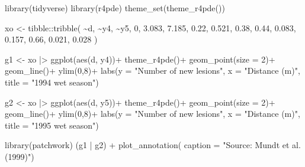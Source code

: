 \documentclass[
  letterpaper,
]{book}
\newenvironment{Shaded}{\begin{snugshade}}{\end{snugshade}}
\newcommand{\AttributeTok}[1]{\textcolor[rgb]{0.40,0.45,0.13}{#1}}
\newcommand{\DecValTok}[1]{\textcolor[rgb]{0.68,0.00,0.00}{#1}}
\newcommand{\FloatTok}[1]{\textcolor[rgb]{0.68,0.00,0.00}{#1}}
\newcommand{\FunctionTok}[1]{\textcolor[rgb]{0.28,0.35,0.67}{#1}}
\newcommand{\NormalTok}[1]{\textcolor[rgb]{0.00,0.23,0.31}{#1}}
\newcommand{\OtherTok}[1]{\textcolor[rgb]{0.00,0.23,0.31}{#1}}
\newcommand{\SpecialCharTok}[1]{\textcolor[rgb]{0.37,0.37,0.37}{#1}}
\newcommand{\StringTok}[1]{\textcolor[rgb]{0.13,0.47,0.30}{#1}}
\begin{document}
\begin{Shaded}
\begin{Highlighting}[]
\FunctionTok{library}\NormalTok{(tidyverse)}
\FunctionTok{library}\NormalTok{(r4pde)}
\FunctionTok{theme\_set}\NormalTok{(}\FunctionTok{theme\_r4pde}\NormalTok{())}

\NormalTok{xo }\OtherTok{\textless{}{-}} 
\NormalTok{tibble}\SpecialCharTok{::}\FunctionTok{tribble}\NormalTok{(}
    \SpecialCharTok{\textasciitilde{}}\NormalTok{d,   }\SpecialCharTok{\textasciitilde{}}\NormalTok{y4,   }\SpecialCharTok{\textasciitilde{}}\NormalTok{y5,}
     \DecValTok{0}\NormalTok{, }\FloatTok{3.083}\NormalTok{, }\FloatTok{7.185}\NormalTok{,}
  \FloatTok{0.22}\NormalTok{, }\FloatTok{0.521}\NormalTok{,  }\FloatTok{0.38}\NormalTok{,}
  \FloatTok{0.44}\NormalTok{, }\FloatTok{0.083}\NormalTok{, }\FloatTok{0.157}\NormalTok{,}
  \FloatTok{0.66}\NormalTok{, }\FloatTok{0.021}\NormalTok{, }\FloatTok{0.028}
\NormalTok{  )}

\NormalTok{g1 }\OtherTok{\textless{}{-}}\NormalTok{ xo }\SpecialCharTok{|\textgreater{}} 
  \FunctionTok{ggplot}\NormalTok{(}\FunctionTok{aes}\NormalTok{(d, y4))}\SpecialCharTok{+}
 \FunctionTok{theme\_r4pde}\NormalTok{()}\SpecialCharTok{+}
  \FunctionTok{geom\_point}\NormalTok{(}\AttributeTok{size =} \DecValTok{2}\NormalTok{)}\SpecialCharTok{+}
  \FunctionTok{geom\_line}\NormalTok{()}\SpecialCharTok{+}
  \FunctionTok{ylim}\NormalTok{(}\DecValTok{0}\NormalTok{,}\DecValTok{8}\NormalTok{)}\SpecialCharTok{+}
  \FunctionTok{labs}\NormalTok{(}\AttributeTok{y =} \StringTok{"Number of new lesions"}\NormalTok{,}
       \AttributeTok{x =} \StringTok{"Distance (m)"}\NormalTok{,}
       \AttributeTok{title =} \StringTok{"1994 wet season"}\NormalTok{)}

\NormalTok{g2 }\OtherTok{\textless{}{-}}\NormalTok{ xo }\SpecialCharTok{|\textgreater{}} 
  \FunctionTok{ggplot}\NormalTok{(}\FunctionTok{aes}\NormalTok{(d, y5))}\SpecialCharTok{+}
  \FunctionTok{theme\_r4pde}\NormalTok{()}\SpecialCharTok{+}
  \FunctionTok{geom\_point}\NormalTok{(}\AttributeTok{size =} \DecValTok{2}\NormalTok{)}\SpecialCharTok{+}
  \FunctionTok{geom\_line}\NormalTok{()}\SpecialCharTok{+}
  \FunctionTok{ylim}\NormalTok{(}\DecValTok{0}\NormalTok{,}\DecValTok{8}\NormalTok{)}\SpecialCharTok{+}
  \FunctionTok{labs}\NormalTok{(}\AttributeTok{y =} \StringTok{"Number of new lesions"}\NormalTok{,}
       \AttributeTok{x =} \StringTok{"Distance (m)"}\NormalTok{,}
       \AttributeTok{title =} \StringTok{"1995 wet season"}\NormalTok{)}

\FunctionTok{library}\NormalTok{(patchwork)}
\NormalTok{(g1 }\SpecialCharTok{|}\NormalTok{ g2) }\SpecialCharTok{+}  \FunctionTok{plot\_annotation}\NormalTok{(}
    \AttributeTok{caption =} \StringTok{"Source: Mundt et al. (1999)"}\NormalTok{)}
\end{Highlighting}
\end{Shaded}
\end{document}
